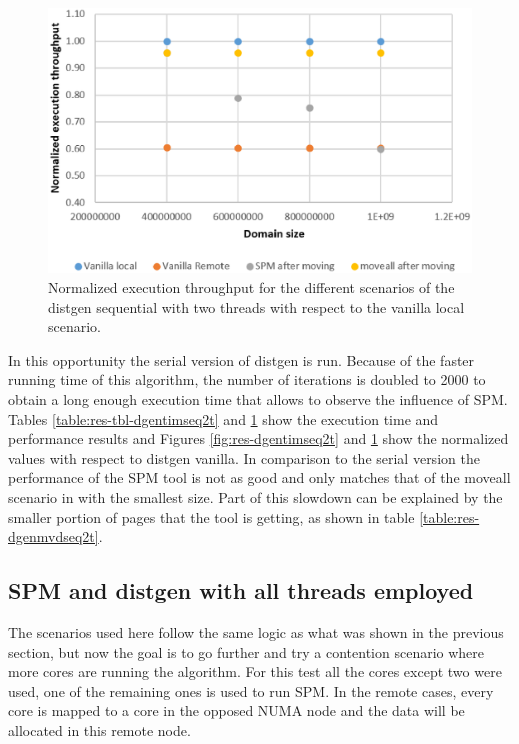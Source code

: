 \begin{figure}
	\centering
		\includegraphics[width=.8\textwidth]{figures/thrput-dgentt-ser.eps}
		\caption{Normalized execution throughput for the different scenarios of the distgen sequential with two threads with respect to the vanilla local scenario.}
		\label{fig:res-dgentrgseq2t}
\end{figure}


In this opportunity the serial version of distgen is run. Because of the faster running time of this algorithm, the number of iterations is doubled to 2000 to obtain a long enough execution time that allows to observe the influence of SPM. Tables \ref{table:res-tbl-dgentimseq2t} and \ref{fig:res-dgentrgseq2t} show the execution time and performance results and Figures \ref{fig:res-dgentimseq2t} and \ref{fig:res-dgentrgseq2t} show the normalized values with respect to distgen vanilla. In comparison to the serial version the performance of the SPM tool is not as good and only matches that of the moveall scenario in with the smallest size. Part of this slowdown can be explained by the smaller portion of pages that the tool is getting, as shown in table \ref{table:res-dgenmvdseq2t}.

\subsection{SPM and distgen with all threads employed}\label{subsection:res-spmydistgen-at}

The scenarios used here follow the same logic as what was shown in the previous section, but now the goal is to go further and try a contention scenario where more cores are running the algorithm. For this test all the cores except two were used, one of the remaining ones is used to run SPM. In the remote cases, every core is mapped to a core in the opposed NUMA node and the data will be allocated in this remote node.

